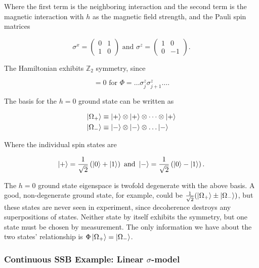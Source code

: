 \noindent Where the first term is the neighboring interaction and the second term is the magnetic interaction with $h$ as the magnetic field strength, and the Pauli spin matrices

\begin{equation}
\sigma^x = \left( \begin{array}{cc} 0 & 1 \\ 1 & 0 \end{array} \right) \text{ and } \sigma^z = \left( \begin{array}{cc} 1 & 0 \\ 0 & -1 \end{array} \right).
\end{equation}

\noindent The Hamiltonian exhibits $\mathbb{Z}_2$ symmetry, since 

\begin{equation}
[\Phi,\hat{H}] = 0 \text{ for } \Phi = \dots \sigma_j^z \sigma_{j+1}^z \dots.
\end{equation}

\noindent The basis for the $h=0$ ground state can be written as

\begin{align}
\ket{\Omega_+} &\equiv \ket{+} \otimes \ket{+} \otimes \dots \otimes \ket{+} \\
\ket{\Omega_-} &\equiv \ket{-} \otimes \ket{-} \otimes \dots \ket{-}
\end{align}

\noindent Where the individual spin states are

\begin{equation}
\ket{+} = \frac{1}{\sqrt{2}} \left( \ket{0} + \ket{1} \right) \text{ and } \ket{-} = \frac{1}{\sqrt{2}} \left( \ket{0} - \ket{1} \right).
\end{equation}

\noindent The $h=0$ ground state eigenspace is twofold degenerate with the above basis. A good, non-degenerate ground state, for example, could be $\frac{1}{\sqrt{2}} ( \ket{\Omega_+} \pm \ket{\Omega_-} )$, but these states are never seen in experiment, since decoherence destroys any superpositions of states. Neither state by itself exhibits the symmetry, but one state must be chosen by measurement. The only information we have about the two states' relationship is $\Phi \ket{\Omega_+} = \ket{\Omega_-}$.

\subsubsection*{Continuous SSB Example: Linear $\sigma$-model}

